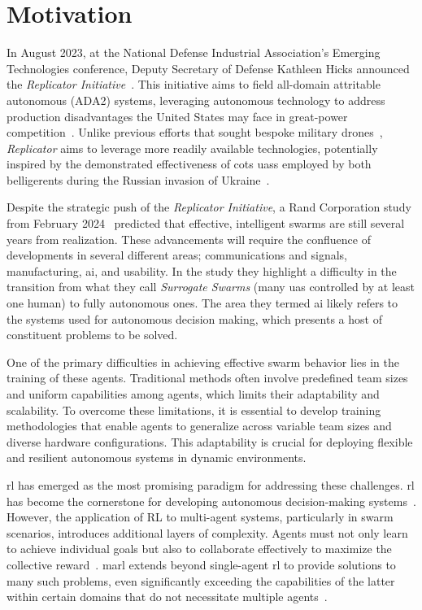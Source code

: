 \section{Motivation}%
\label{sec:motivation}

In August 2023, at the National Defense Industrial Association's 
Emerging Technologies conference, Deputy Secretary of Defense Kathleen Hicks 
announced the \emph{Replicator Initiative}~\cite{robertson2023}. 
This initiative aims to field all-domain attritable autonomous (ADA2) systems,
leveraging autonomous technology to address production disadvantages the 
United States may face in great-power competition~\cite{zotero-2656}. 
Unlike previous efforts that sought bespoke military drones~\cite{bajak2023}, 
\emph{Replicator} aims to leverage more readily available technologies, 
potentially inspired by the demonstrated effectiveness of \gls{cots} \glspl{uas} 
employed by both belligerents during the Russian invasion of Ukraine~\cite{bajak2023a}.

Despite the strategic push of the \emph{Replicator Initiative}, 
a Rand Corporation study from February 2024~\cite{gerstein2024} predicted 
that effective, intelligent swarms are still several years from realization. 
These advancements will require the confluence of developments in several 
different areas; communications and signals, manufacturing, \gls{ai},
and usability. In the study they highlight a difficulty in the transition 
from what they call \emph{Surrogate Swarms} (many \gls{uas} controlled
by at least one human) to fully autonomous ones.
The area they termed \gls*{ai} likely refers to the systems used for autonomous 
decision making, which presents a host of constituent problems to be solved.

One of the primary difficulties in achieving effective swarm behavior 
lies in the training of these agents. Traditional methods often 
involve predefined team sizes and uniform capabilities among agents, 
which limits their adaptability and scalability. To overcome these limitations, 
it is essential to develop training methodologies that enable agents to 
generalize across variable team sizes and diverse hardware configurations. 
This adaptability is crucial for deploying flexible and resilient autonomous 
systems in dynamic environments.

\Gls{rl} has emerged as the most promising paradigm for addressing 
these challenges. \Gls{rl} has become the cornerstone for developing 
autonomous decision-making systems~\cite{sutton2018}. However, 
the application of RL to multi-agent systems, particularly in swarm scenarios, 
introduces additional layers of complexity. 
Agents must not only learn to achieve individual goals but also to 
collaborate effectively to maximize the collective reward~\cite{cao2012}.
\Gls{marl} extends beyond single-agent \gls{rl} to provide solutions 
to many such problems, even significantly exceeding the capabilities 
of the latter within certain domains that do not necessitate multiple 
agents~\cite{gronauer2022}. 


